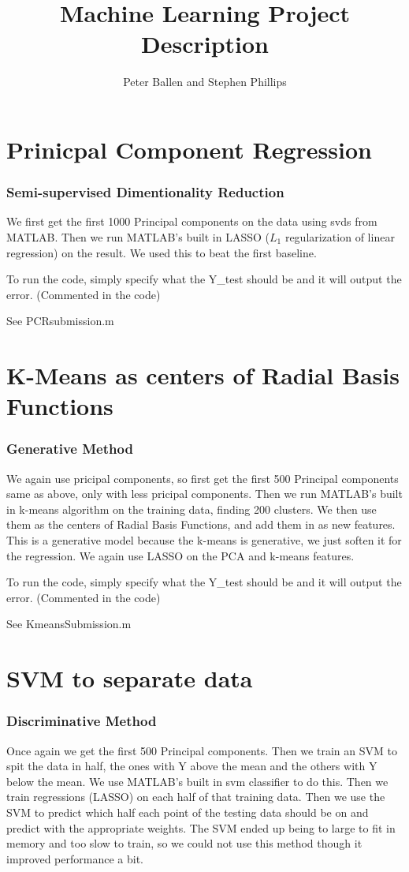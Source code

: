 \documentclass[a4paper,10pt]{article}
\title{Machine Learning Project Description}
\author{Peter Ballen and Stephen Phillips}
\begin{document}
\maketitle

\section{Prinicpal Component Regression}
\subsubsection*{Semi-supervised Dimentionality Reduction}
We first get the first 1000 Principal components on the data using svds from MATLAB.
Then we run MATLAB's built in LASSO ($L_1$ regularization of linear regression) on the result. We used this to beat the first baseline. 

To run the code, simply specify what the Y\_test should be and it will output the error. (Commented in the code)

See PCRsubmission.m

\section{K-Means as centers of Radial Basis Functions}
\subsubsection*{Generative Method}
We again use pricipal components, so first get the first 500 Principal components same as above, only with less pricipal components.
Then we run MATLAB's built in k-means algorithm on the training data, finding 200 clusters. We then use them as the centers of
Radial Basis Functions, and add them in as new features. This is a generative model because the k-means is generative, we just
soften it for the regression. We again use LASSO on the PCA and k-means features.

To run the code, simply specify what the Y\_test should be and it will output the error. (Commented in the code)

See KmeansSubmission.m

\section{SVM to separate data}
\subsubsection*{Discriminative Method}
Once again we get the first 500 Principal components. Then we train an SVM to spit the data in half, the ones with Y above the mean and the
others with Y below the mean. We use MATLAB's built in svm classifier to do this. Then we train regressions (LASSO) on each half of that training data.
Then we use the SVM to predict which half each point of the testing data should be on and predict with the appropriate weights. The SVM ended up being
to large to fit in memory and too slow to train, so we could not use this method though it improved performance a bit.
\end{document}

